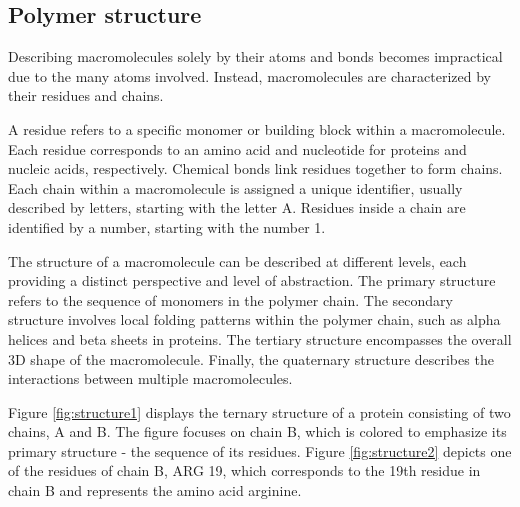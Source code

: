 \documentclass[
  digital,     %
  oneside,     %
  nosansbold,  %
  nocolorbold, %
  lof,         %
  lot,         %
]{fithesis4}
\begin{document}
\subsection{Polymer structure}
\label{section:polymer_structure}

Describing macromolecules solely by their atoms and bonds becomes impractical due to the many atoms involved. Instead, macromolecules are characterized by their residues and chains.

A residue refers to a specific monomer or building block within a macromolecule. Each residue corresponds to an amino acid and nucleotide for proteins and nucleic acids, respectively. Chemical bonds link residues together to form chains. Each chain within a macromolecule is assigned a unique identifier, usually described by letters, starting with the letter A. Residues inside a chain are identified by a number, starting with the number 1. \cite{gu2009structural}

The structure of a macromolecule can be described at different levels, each providing a distinct perspective and level of abstraction. The primary structure refers to the sequence of monomers in the polymer chain. The secondary structure involves local folding patterns within the polymer chain, such as alpha helices and beta sheets in proteins. The tertiary structure encompasses the overall 3D shape of the macromolecule. Finally, the quaternary structure describes the interactions between multiple macromolecules. \cite{branden1999introduction, pdb101_hierarchical}

Figure \ref{fig:structure1} displays the ternary structure of a protein consisting of two chains, A and B. The figure focuses on chain B, which is colored to emphasize its primary structure - the sequence of its residues. Figure \ref{fig:structure2} depicts one of the residues of chain B, ARG 19, which corresponds to the 19th residue in chain B and represents the amino acid arginine.
\end{document}
